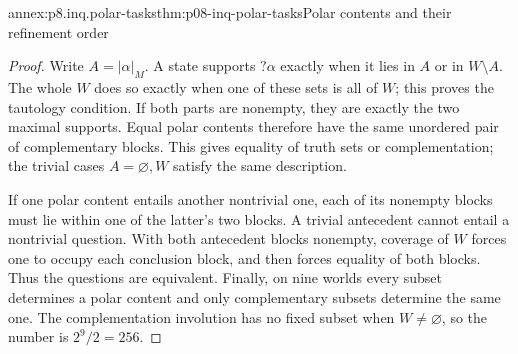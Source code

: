 \begin{annexitem}{annex:p8.inq.polar-tasks}{thm:p08-inq-polar-tasks}{Polar contents and their refinement order}
\begin{proof}
Write \(A=|\alpha|_M\). A state supports \(?\alpha\) exactly when
it lies in \(A\) or in \(W\setminus A\). The whole \(W\) does so
exactly when one of these sets is all of \(W\); this proves the
tautology condition. If both parts are nonempty, they are exactly the
two maximal supports. Equal polar contents therefore have the same
unordered pair of complementary blocks. This gives equality of truth
sets or complementation; the trivial cases \(A=\varnothing,W\)
satisfy the same description.

If one polar content entails another nontrivial one, each of its
nonempty blocks must lie within one of the latter's two blocks.
A trivial antecedent cannot entail a nontrivial question. With both
antecedent blocks nonempty, coverage of \(W\) forces one to occupy
each conclusion block, and then forces equality of both blocks. Thus
the questions are equivalent. Finally, on nine worlds every subset
determines a polar content and only complementary subsets determine
the same one. The complementation involution has no fixed subset
when \(W\ne\varnothing\), so the number is \(2^9/2=256\).
\end{proof}
\end{annexitem}

